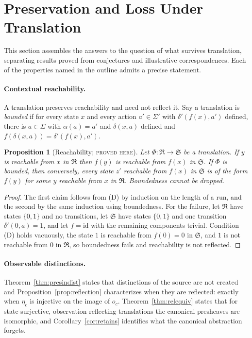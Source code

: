 \documentclass[11pt]{article}
\newtheorem{proposition}[theorem]{Proposition}
\theoremstyle{definition}
\theoremstyle{remark}
\newcommand{\stN}{\textsc{proved here}}
\newcommand{\fR}{\mathfrak R}
\newcommand{\fS}{\mathfrak S}
\newcommand{\id}{\mathrm{id}}
\begin{document}
\section{Preservation and Loss Under Translation}

This section assembles the answers to the question of what survives translation, separating results proved from conjectures and illustrative correspondences. Each of the properties named in the outline admits a precise statement.

\paragraph{Contextual reachability.} A translation preserves reachability and need not reflect it. Say a translation is \emph{bounded} if for every state $x$ and every action $a'\in\Sigma'$ with $\delta'(f(x),a')$ defined, there is $a\in\Sigma$ with $\alpha(a)=a'$ and $\delta(x,a)$ defined and $f(\delta(x,a))=\delta'(f(x),a')$.

\begin{proposition}[Reachability; \stN]\label{prop:reach}
Let $\Phi:\fR\to\fS$ be a translation. If $y$ is reachable from $x$ in $\fR$ then $f(y)$ is reachable from $f(x)$ in $\fS$. If $\Phi$ is bounded, then conversely, every state $z'$ reachable from $f(x)$ in $\fS$ is of the form $f(y)$ for some $y$ reachable from $x$ in $\fR$. Boundedness cannot be dropped.
\end{proposition}
\begin{proof}
The first claim follows from (D) by induction on the length of a run, and the second by the same induction using boundedness. For the failure, let $\fR$ have states $\{0,1\}$ and no transitions, let $\fS$ have states $\{0,1\}$ and one transition $\delta'(0,a)=1$, and let $f=\id$ with the remaining components trivial. Condition (D) holds vacuously, the state $1$ is reachable from $f(0)=0$ in $\fS$, and $1$ is not reachable from $0$ in $\fR$, so boundedness fails and reachability is not reflected.
\end{proof}

\paragraph{Observable distinctions.} Theorem~\ref{thm:presindist} states that distinctions of the source are not created and Proposition~\ref{prop:reflection} characterizes when they are reflected: exactly when $\eta_c$ is injective on the image of $o_c$. Theorem~\ref{thm:relequiv} states that for state-surjective, observation-reflecting translations the canonical presheaves are isomorphic, and Corollary~\ref{cor:retains} identifies what the canonical abstraction forgets.
\end{document}

